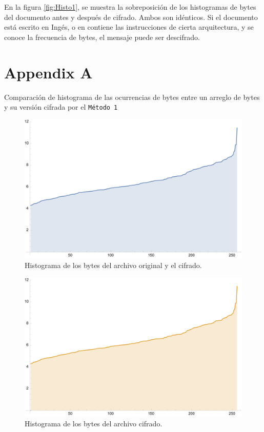 \documentclass[a4paper]{article}
\begin{document}
En la figura \ref{fig:Histo1}, se muestra la sobreposición de los histogramas
de bytes del documento antes y después de cifrado. Ambos son idénticos. Si el
documento está escrito en Ingés, o en contiene las instrucciones de cierta
arquitectura, y se conoce la frecuencia de bytes, el mensaje puede ser
descifrado.


\printbibliography

\newpage

\appendix

\section*{Appendix A}

Comparación de histograma de las ocurrencias de bytes entre un arreglo de bytes
y su versión cifrada por el \texttt{Método 1}

\begin{figure}[H]
    \centering
    \includegraphics[scale=0.7]{historygramorig.png}
    \caption*{Histograma de los bytes del archivo
original y el cifrado.}
\end{figure}

\begin{figure}[H]
    \centering
    \includegraphics[scale=0.7]{historygramorig2.png}
    \caption*{Histograma de los bytes del archivo cifrado.}
\end{figure}
\end{document}
